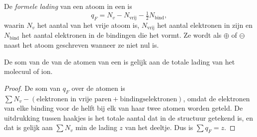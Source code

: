 \begin{definition}\label{def:b1:lewis-resonance-vsepr:formal-charge}
De \emph{formele lading} van een atoom in een
 is
\[
  q_F = N_v - N_{\text{vrij}} - \tfrac12 N_{\text{bind}},
\]
waarin $N_v$ het aantal  van het vrije atoom is,
$N_{\text{vrij}}$ het aantal elektronen in zijn  en
$N_{\text{bind}}$ het aantal elektronen in de bindingen die het vormt. Ze
wordt als $\oplus$ of $\ominus$ naast het atoom geschreven wanneer ze niet
nul is.
\end{definition}

\begin{proposition}\label{prop:b1:lewis-resonance-vsepr:formal-sum}
De som van de  van de atomen van een  is
gelijk aan de totale lading van het molecuul of ion.
\end{proposition}

\begin{proof}
De som van $q_F$ over de atomen is $\sum N_v - (\text{elektronen in vrije
paren} + \text{bindingselektronen})$, omdat de elektronen van elke
binding voor de helft bij elk van haar twee atomen worden geteld. De
uitdrukking tussen haakjes is het totale aantal  dat in
de structuur getekend is, en dat is gelijk aan $\sum N_v$ min de lading
$z$ van het deeltje. Dus is $\sum q_F = z$.
\end{proof}


